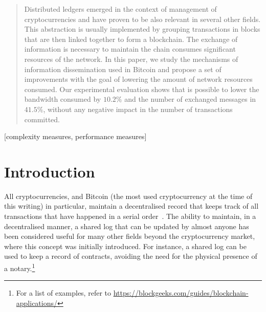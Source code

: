 \documentclass{dads}   %
\begin{document}
\date{30 July 1999}

\maketitle
\begin{abstract}
Distributed ledgers emerged in the context of management of cryptocurrencies and have proven to be also relevant in several other fields. This abstraction is usually implemented by grouping transactions in blocks that are then linked together to form a blockchain. The exchange of information is necessary to maintain the chain consumes significant resources of the network. In this paper, we study the mechanisms of information dissemination used in Bitcoin and propose a set of improvements with the goal of lowering the amount of network resources consumed. Our experimental evaluation shows that is possible to lower the bandwidth consumed by $10.2\%$ and the number of exchanged messages in $41.5\%$, without any negative impact in the number of transactions committed.
\end{abstract}

[complexity measures, performance measures]



\section{Introduction}
All cryptocurrencies, and Bitcoin (the most used cryptocurrency at the time of  this writing) in particular, maintain a decentralised record that keeps track of all transactions that have happened in a serial order~\cite{nakamoto2008bitcoin}. The ability to maintain, in a decentralised manner, a shared log that can be updated by almost anyone has been considered useful for many other fields beyond the cryptocurrency market, where this concept was initially introduced. For instance, a shared log can be used to keep a record of contracts, avoiding the need for the physical presence of a notary.\footnote{For a list of examples, refer to \url{https://blockgeeks.com/guides/blockchain-applications/}}
\end{document}
